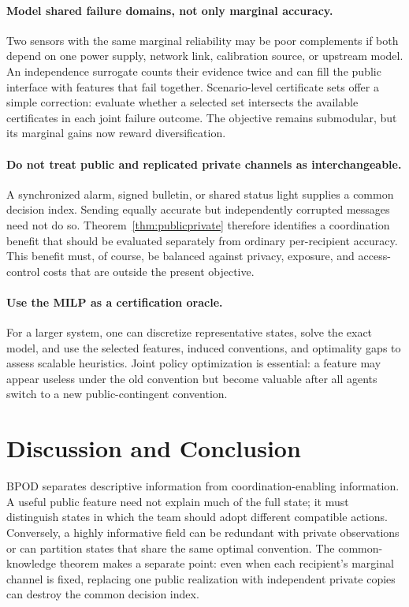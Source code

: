 \paragraph{Model shared failure domains, not only marginal accuracy.}
Two sensors with the same marginal reliability may be poor complements if both depend on one power supply, network link, calibration source, or upstream model. An independence surrogate counts their evidence twice and can fill the public interface with features that fail together. Scenario-level certificate sets offer a simple correction: evaluate whether a selected set intersects the available certificates in each joint failure outcome. The objective remains submodular, but its marginal gains now reward diversification.

\paragraph{Do not treat public and replicated private channels as interchangeable.}
A synchronized alarm, signed bulletin, or shared status light supplies a common decision index. Sending equally accurate but independently corrupted messages need not do so. Theorem~\ref{thm:publicprivate} therefore identifies a coordination benefit that should be evaluated separately from ordinary per-recipient accuracy. This benefit must, of course, be balanced against privacy, exposure, and access-control costs that are outside the present objective.

\paragraph{Use the MILP as a certification oracle.}
For a larger system, one can discretize representative states, solve the exact model, and use the selected features, induced conventions, and optimality gaps to assess scalable heuristics. Joint policy optimization is essential: a feature may appear useless under the old convention but become valuable after all agents switch to a new public-contingent convention.

\section{Discussion and Conclusion}

BPOD separates descriptive information from coordination-enabling information. A useful public feature need not explain much of the full state; it must distinguish states in which the team should adopt different compatible actions. Conversely, a highly informative field can be redundant with private observations or can partition states that share the same optimal convention. The common-knowledge theorem makes a separate point: even when each recipient's marginal channel is fixed, replacing one public realization with independent private copies can destroy the common decision index.


